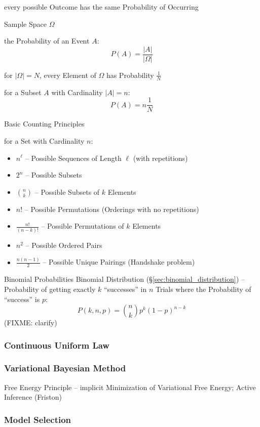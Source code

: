 every possible Outcome has the same Probability of Occurring

Sample Space $\Omega$

the Probability of an Event $A$:
\[
  P(A) = \frac{|A|}{|\Omega|}
\]

for $|\Omega| = N$, every Element of $\Omega$ has Probability $\frac{1}{N}$

for a Subset $A$ with Cardinality $|A| = n$:
\[
  P(A) = n \frac{1}{N}
\]


Basic Counting Principles

for a Set with Cardinality $n$:
\begin{itemize}
  \item $n^\ell$ -- Possible Sequences of Length $\ell$ (with repetitions)
  \item $2^n$ -- Possible Subsets
  \item $\binom{n}{k}$ -- Possible Subsets of $k$ Elements
  \item $n!$ -- Possible Permutations (Orderings with no repetitions)
  \item $\frac{n!}{(n-k)!}$ -- Possible Permutations of $k$ Elements
  \item $n^2$ -- Possible Ordered Pairs
  \item $\frac{n(n-1)}{2}$ -- Possible Unique Pairings (Handshake problem)
\end{itemize}


Binomial Probabilities \fist Binomial Distribution
(\S\ref{sec:binomial_distribution}) -- Probability of getting exactly $k$
``successes'' in $n$ Trials where the Probability of ``success'' is $p$:
\[
  P(k,n,p) = \binom{n}{k}p^k(1-p)^{n-k}
\]
(FIXME: clarify)



\subsubsection{Continuous Uniform Law}\label{sec:continuous_uniform_law}

\subsubsection{Variational Bayesian Method}
\label{sec:variational_bayesian_method}

Free Energy Principle -- implicit Minimization of Variational Free Energy;
Active Inference (Friston)



\subsubsection{Model Selection}\label{sec:model_selection}

